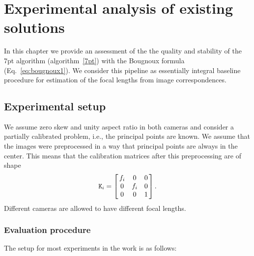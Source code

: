 
\chapter{Experimental analysis of existing solutions}

\label{seq:analysis}

In this chapter we provide an assessment of the the quality and stability of the 7pt algorithm (algorithm~\ref{7pt}) with the Bougnoux formula (Eq.~\ref{eq:bougnoux1}). We consider this pipeline as essentially integral baseline procedure for estimation of the focal lengths from image correspondences.


\section{Experimental setup}


We assume zero skew and unity aspect ratio in both cameras and consider a partially calibrated problem, i.e., the principal points are known. We assume that the images were preprocessed in a way that principal points are always in the center. This means that the calibration matrices after this preprocessing are of shape \[ \mathtt{K}_i = \mat{ccc}{f_i & 0 & 0 \\ 0 & f_i & 0 \\ 0 & 0 & 1}. \] Different cameras are allowed to have different focal lengths.

\subsection{Evaluation procedure}
The setup for most experiments in the work is as follows:

